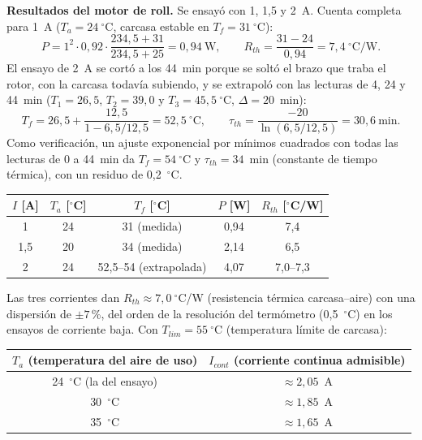 \documentclass[11pt,a4paper]{article}
\begin{document}
\textbf{Resultados del motor de roll.} Se ensayó con 1, 1,5 y 2~A. Cuenta completa para 1~A ($T_a = 24~^\circ$C, carcasa estable en $T_f = 31~^\circ$C):
\[
P = 1^2 \cdot 0{,}92 \cdot \frac{234{,}5 + 31}{234{,}5 + 25} = 0{,}94~\text{W},
\qquad
R_{th} = \frac{31 - 24}{0{,}94} = 7{,}4~^\circ\text{C/W}.
\]
El ensayo de 2~A se cortó a los 44~min porque se soltó el brazo que traba el rotor, con la carcasa todavía subiendo, y se extrapoló con las lecturas de 4, 24 y 44~min ($T_1 = 26{,}5$, $T_2 = 39{,}0$ y $T_3 = 45{,}5~^\circ$C, $\Delta = 20$~min):
\[
T_f = 26{,}5 + \frac{12{,}5}{1 - 6{,}5/12{,}5} = 52{,}5~^\circ\text{C},
\qquad
\tau_{th} = \frac{-20}{\ln(6{,}5/12{,}5)} = 30{,}6~\text{min}.
\]
Como verificación, un ajuste exponencial por mínimos cuadrados con todas las lecturas de 0 a 44~min da $T_f = 54~^\circ$C y $\tau_{th} = 34$~min (constante de tiempo térmica), con un residuo de 0,2~$^\circ$C.

\begin{center}
\begin{tabular}{ccccc}
\toprule
$I$ [A] & $T_a$ [$^\circ$C] & $T_f$ [$^\circ$C] & $P$ [W] & $R_{th}$ [$^\circ$C/W] \\
\midrule
1   & 24 & 31 (medida)            & 0,94 & 7,4 \\
1,5 & 20 & 34 (medida)            & 2,14 & 6,5 \\
2   & 24 & 52,5--54 (extrapolada) & 4,07 & 7,0--7,3 \\
\bottomrule
\end{tabular}
\end{center}

Las tres corrientes dan $R_{th} \approx 7{,}0~^\circ$C/W (resistencia térmica carcasa--aire) con una dispersión de $\pm 7$\,\%, del orden de la resolución del termómetro (0,5~$^\circ$C) en los ensayos de corriente baja. Con $T_{lim} = 55~^\circ$C (temperatura límite de carcasa):

\begin{center}
\begin{tabular}{cc}
\toprule
$T_a$ (temperatura del aire de uso) & $I_{cont}$ (corriente continua admisible) \\
\midrule
24~$^\circ$C (la del ensayo) & $\approx 2{,}05$~A \\
30~$^\circ$C & $\approx 1{,}85$~A \\
35~$^\circ$C & $\approx 1{,}65$~A \\
\bottomrule
\end{tabular}
\end{center}
\end{document}
